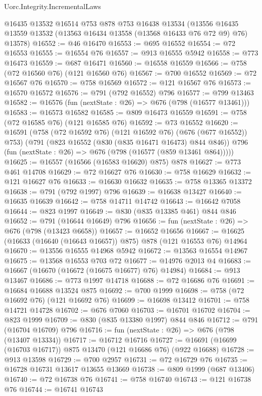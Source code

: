 \begin{lexlean}{Uorc.Integrity.IncrementalLaws}
\begin{coremodule}
    @16435
    @13532
    @16514
    @753
    @878
    @753
    @16438
    @13534
    (@13556 @16435 @13559 @13532 (@13563 @16434 @13558 (@13568 @16433 @76 @72 @9) @76) @13578)
@16552 := @46 @16470
@16553 := @695 @16552
@16554 := @72 @16553
@16555 := @16554 @76
@16557 := @913 @16555 @5942
@16558 := @773 @16473
@16559 := @687 @16471
@16560 := @16558 @16559
@16566 := @758 (@72 @16560 @76) (@121 @16560 @76)
@16567 := @700 @16552
@16569 := @72 @16567 @76
@16570 := @758 @16569
@16572 := @121 @16567 @76
@16573 := @16570 @16572
@16576 := @791 (@792 @16552) @796
@16577 := @799 @13463
@16582 := @16576 (fun (nextState : @26) => @676 (@798 (@16577 @13461)))
@16583 := @16573 @16582
@16585 := @809 @16473 @16559
@16591 := @758 (@72 @16585 @76) (@121 @16585 @76)
@16592 := @73 @16552
@16620 := @16591
    (@758 (@72 @16592 @76) (@121 @16592 @76) (@676 (@677 @16552)) @753)
    (@791
      (@823 @16552 (@830 (@835 @16471 @16473) @844 @846))
      @796
      (fun (nextState : @26) => @676 (@798 (@16577 (@859 @13461 @864)))))
@16625 := @16557 (@16566 (@16583 @16620) @875) @878
@16627 := @773 @461 @14708
@16629 := @72 @16627 @76
@16630 := @758 @16629
@16632 := @121 @16627 @76
@16633 := @16630 @16632
@16635 := @758 @13365 @13372
@16638 := @791 (@792 @1997) @796
@16639 := @16638 @13427
@16640 := @16635 @16639
@16642 := @758 @14711 @14742
@16643 := @16642 @7058
@16644 := @823 @1997
@16649 := @830 (@835 @13385 @461) @844 @846
@16652 := @791 (@16644 @16649) @796
@16656 := fun (nextState : @26) => @676 (@798 (@13423 @6658))
@16657 := @16652 @16656
@16667 := @16625 (@16633 (@16640 (@16643 @16657)) @875) @878 (@121 @16553 @76) @14964
@16670 := @13556 @16555 @14968 @5942
@16672 := @13563 @16554 @14967
@16675 := @13568 @16553 @703 @72
@16677 := @14976 @2013 @4
@16683 := @16667 (@16670 (@16672 (@16675 @16677) @76) @14984)
@16684 := @913 @13467
@16686 := @773 @1997 @14718
@16688 := @72 @16686 @76
@16691 := @16684 @16688 @13524 @875
@16692 := @700 @1999
@16698 := @758 (@72 @16692 @76) (@121 @16692 @76)
@16699 := @16698 @13412
@16701 := @758 @14721 @14728
@16702 := @676 @7060
@16703 := @16701 @16702
@16704 := @823 @1999
@16709 := @830 (@835 @13380 @1997) @844 @846
@16712 := @791 (@16704 @16709) @796
@16716 := fun (nextState : @26) => @676 (@798 (@13407 @13334))
@16717 := @16712 @16716
@16727 := @16691 (@16699 (@16703 @16717)) @875 @13470 (@121 @16686 @76) (@922 @16688)
@16728 := @913 @13598
@16729 := @700 @2957
@16731 := @72 @16729 @76
@16735 := @16728 @16731 @13617 @13655 @13669
@16738 := @809 @1999 (@687 @13406)
@16740 := @72 @16738 @76
@16741 := @758 @16740
@16743 := @121 @16738 @76
@16744 := @16741 @16743

\end{coremodule}
\end{lexlean}
